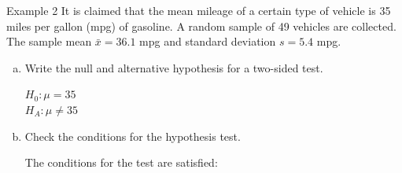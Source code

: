 \documentclass[fleqn, 10pt]{beamer}\usepackage[]{graphicx}\usepackage[]{color}
\begin{document}
\begin{frame}{Example 2}
It is claimed that the mean mileage of a certain type of vehicle is 35 miles per gallon (mpg) of gasoline.  A random sample of 49 vehicles are collected.  The sample mean $\bar{x}=36.1$ mpg and standard deviation $s=5.4$ mpg. 
\begin{enumerate}[(a)]
\item Write the null and alternative hypothesis for a two-sided test.

\medskip
{\color{blue} $H_0: \mu = 35$\\
$H_A: \mu \neq 35$}
\smallskip

\item Check the conditions for the hypothesis test.

\medskip
{\color{blue} The conditions for the test are satisfied:}\\

\end{enumerate}
\end{frame}
\end{document}
